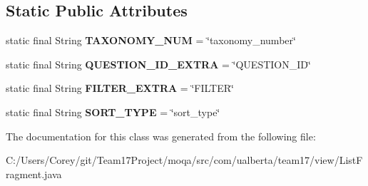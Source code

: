 \subsection*{Static Public Attributes}
\begin{DoxyCompactItemize}
\item 
\hypertarget{classcom_1_1ualberta_1_1team17_1_1view_1_1_list_fragment_a029ee70adae3012ddf4f4fa6b7f6508a}{static final String {\bfseries T\+A\+X\+O\+N\+O\+M\+Y\+\_\+\+N\+U\+M} = \char`\"{}taxonomy\+\_\+number\char`\"{}}\label{classcom_1_1ualberta_1_1team17_1_1view_1_1_list_fragment_a029ee70adae3012ddf4f4fa6b7f6508a}

\item 
\hypertarget{classcom_1_1ualberta_1_1team17_1_1view_1_1_list_fragment_adfbad9137e232c82d1315afea2845aa5}{static final String {\bfseries Q\+U\+E\+S\+T\+I\+O\+N\+\_\+\+I\+D\+\_\+\+E\+X\+T\+R\+A} = \char`\"{}Q\+U\+E\+S\+T\+I\+O\+N\+\_\+\+I\+D\char`\"{}}\label{classcom_1_1ualberta_1_1team17_1_1view_1_1_list_fragment_adfbad9137e232c82d1315afea2845aa5}

\item 
\hypertarget{classcom_1_1ualberta_1_1team17_1_1view_1_1_list_fragment_ae9a9ad17a7f59e6e5b5c9849d360e0b5}{static final String {\bfseries F\+I\+L\+T\+E\+R\+\_\+\+E\+X\+T\+R\+A} = \char`\"{}F\+I\+L\+T\+E\+R\char`\"{}}\label{classcom_1_1ualberta_1_1team17_1_1view_1_1_list_fragment_ae9a9ad17a7f59e6e5b5c9849d360e0b5}

\item 
\hypertarget{classcom_1_1ualberta_1_1team17_1_1view_1_1_list_fragment_a25176ca51067a389e61531782d5b2e43}{static final String {\bfseries S\+O\+R\+T\+\_\+\+T\+Y\+P\+E} = \char`\"{}sort\+\_\+type\char`\"{}}\label{classcom_1_1ualberta_1_1team17_1_1view_1_1_list_fragment_a25176ca51067a389e61531782d5b2e43}

\end{DoxyCompactItemize}


The documentation for this class was generated from the following file\+:\begin{DoxyCompactItemize}
\item 
C\+:/\+Users/\+Corey/git/\+Team17\+Project/moqa/src/com/ualberta/team17/view/List\+Fragment.\+java\end{DoxyCompactItemize}
